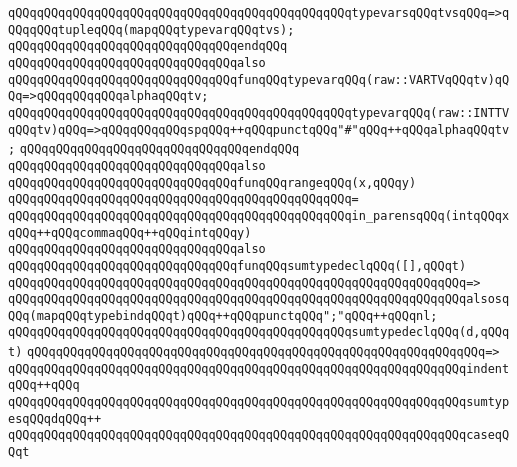 \verb|qQQqqQQqqQQqqQQqqQQqqQQqqQQqqQQqqQQqqQQqqQQqqQQqtypevarsqQQqtvsqQQq=>qQQqqQQqtupleqQQq(mapqQQqtypevarqQQqtvs);|\newline
\verb|qQQqqQQqqQQqqQQqqQQqqQQqqQQqqQQqendqQQq|\newline
\newline
\verb|qQQqqQQqqQQqqQQqqQQqqQQqqQQqqQQqalso|\newline
\verb|qQQqqQQqqQQqqQQqqQQqqQQqqQQqqQQqfunqQQqtypevarqQQq(raw::VARTVqQQqtv)qQQq=>qQQqqQQqqQQqalphaqQQqtv;|\newline
\verb|qQQqqQQqqQQqqQQqqQQqqQQqqQQqqQQqqQQqqQQqqQQqqQQqtypevarqQQq(raw::INTTVqQQqtv)qQQq=>qQQqqQQqqQQqspqQQq++qQQqpunctqQQq"#"qQQq++qQQqalphaqQQqtv;|\newline
\verb|qQQqqQQqqQQqqQQqqQQqqQQqqQQqqQQqendqQQq|\newline
\newline
\verb|qQQqqQQqqQQqqQQqqQQqqQQqqQQqqQQqalso|\newline
\verb|qQQqqQQqqQQqqQQqqQQqqQQqqQQqqQQqfunqQQqrangeqQQq(x,qQQqy)|\newline
\verb|qQQqqQQqqQQqqQQqqQQqqQQqqQQqqQQqqQQqqQQqqQQqqQQq=|\newline
\verb|qQQqqQQqqQQqqQQqqQQqqQQqqQQqqQQqqQQqqQQqqQQqqQQqin_parensqQQq(intqQQqxqQQq++qQQqcommaqQQq++qQQqintqQQqy)|\newline
\newline
\verb|qQQqqQQqqQQqqQQqqQQqqQQqqQQqqQQqalso|\newline
\verb|qQQqqQQqqQQqqQQqqQQqqQQqqQQqqQQqfunqQQqsumtypedeclqQQq([],qQQqt)|\newline
\verb|qQQqqQQqqQQqqQQqqQQqqQQqqQQqqQQqqQQqqQQqqQQqqQQqqQQqqQQqqQQqqQQq=>|\newline
\verb|qQQqqQQqqQQqqQQqqQQqqQQqqQQqqQQqqQQqqQQqqQQqqQQqqQQqqQQqqQQqqQQqalsosqQQq(mapqQQqtypebindqQQqt)qQQq++qQQqpunctqQQq";"qQQq++qQQqnl;|\newline
\newline
\verb|qQQqqQQqqQQqqQQqqQQqqQQqqQQqqQQqqQQqqQQqqQQqqQQqsumtypedeclqQQq(d,qQQqt)|\newline
\verb|qQQqqQQqqQQqqQQqqQQqqQQqqQQqqQQqqQQqqQQqqQQqqQQqqQQqqQQqqQQqqQQq=>|\newline
\verb|qQQqqQQqqQQqqQQqqQQqqQQqqQQqqQQqqQQqqQQqqQQqqQQqqQQqqQQqqQQqqQQqindentqQQq++qQQq|\newline
\verb|qQQqqQQqqQQqqQQqqQQqqQQqqQQqqQQqqQQqqQQqqQQqqQQqqQQqqQQqqQQqqQQqsumtypesqQQqdqQQq++|\newline
\newline
\verb|qQQqqQQqqQQqqQQqqQQqqQQqqQQqqQQqqQQqqQQqqQQqqQQqqQQqqQQqqQQqqQQqcaseqQQqt|\newline
